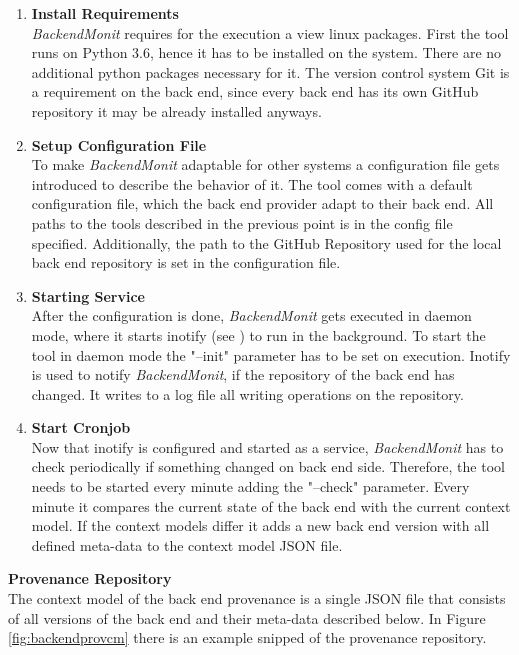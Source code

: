 \documentclass[draft,final]{vutinfth} %
\begin{document}
\begin{enumerate}
	\item \textbf{Install Requirements} \\
	\textit{BackendMonit} requires for the execution a view linux packages. First the tool runs on Python 3.6, hence it has to be installed on the system. There are no additional python packages necessary for it. The version control system Git is a requirement on the back end, since every back end has its own GitHub repository it may be already installed anyways. 
	
	\item \textbf{Setup Configuration File} \\
	To make \textit{BackendMonit} adaptable for other systems a configuration file gets introduced to describe the behavior of it. The tool comes with a default configuration file, which the back end provider adapt to their back end. All paths to the tools described in the previous point is in the config file specified. Additionally, the path to the GitHub Repository used for the local back end repository is set in the configuration file.      
	     
	\item \textbf{Starting Service} \\
	After the configuration is done, \textit{BackendMonit} gets executed in daemon mode, where it starts inotify (see \cite{inotifywait}) to run in the background. To start the tool in daemon mode the "--init" parameter has to be set on execution. Inotify is used to notify \textit{BackendMonit}, if the repository of the back end has changed. It writes to a log file all writing operations on the repository.    
	
	\item \textbf{Start Cronjob} \\
	Now that inotify is configured and started as a service, \textit{BackendMonit} has to check periodically if something changed on back end side. Therefore, the tool needs to be started every minute adding the "--check" parameter. Every minute it compares the current state of the back end with the current context model. If the context models differ it adds a new back end version with all defined meta-data to the context model JSON file. 	 
\end{enumerate}

\textbf{Provenance Repository} \\
The context model of the back end provenance is a single JSON file that consists of all versions of the back end and their meta-data described below. In Figure \ref{fig:backendprovcm} there is an example snipped of the provenance repository. 
\end{document}

